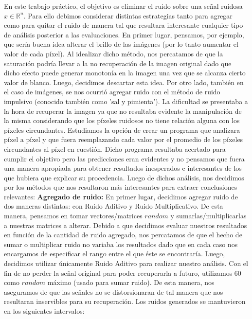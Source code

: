 \documentclass[10pt, a4paper]{article}
\newcommand{\real}{\mathbb{R}}
\begin{document}
\begin{itemize}
En este trabajo práctico, el objetivo es eliminar el ruido sobre una señal ruidosa $x\in\real^{n}$. Para ello debimos considerar distintas estrategias tanto para agregar como para quitar el ruido de manera tal que resultara interesante cualquier tipo de análisis posterior a las evaluaciones. En primer lugar, pensamos, por ejemplo, que sería buena idea alterar el brillo de las imágenes (por lo tanto aumentar el valor de cada píxel). Al idealizar dicho método, nos percatamos de que la saturación podría llevar a la no recuperación de la imagen original dado que dicho efecto puede generar monotonía en la imagen una vez que se alcanza cierto valor de blanco. Luego, decidimos descartar esta idea.
\newline
Por otro lado, también en el caso de imágenes, se nos ocurrió agregar ruido con el método de ruido impulsivo (conocido también como 'sal y pimienta'). La dificultad se presentaba a la hora de recuperar la imagen ya que no resultaba evidente la manipulación de la misma considerando que los píxeles ruidosos no tiene relación alguna con los píxeles circundantes. Estudiamos la opción de crear un programa que analizara píxel a píxel y que fuera reemplazando cada valor por el promedio de los píxeles circundantes al píxel en cuestión. Dicho programa resultaba acertado para cumplir el objetivo pero las predicciones eran evidentes y no pensamos que fuera una manera apropiada para obtener resultados inesperados e interesantes de los que hubiera que explicar su procedencia.\newline
\newline
Luego de dichos análisis, nos decidimos por los métodos que nos resultaron más interesantes para extraer conclusiones relevantes: \newline
\newline
\large{\textbf{Agregado de ruido:}}\newline
En primer lugar, decidimos agregar ruido de dos maneras distintas: con Ruido Aditivo y Ruido Multiplicativo. De esta manera, pensamos en tomar vectores/matrices $random$ y sumarlas/multiplicarlas a nuestras matrices a alterar. Debido a que decidimos evaluar nuestros resultados en función de la cantidad de ruido agregado, nos percatamos de que el hecho de sumar o multiplicar ruido no variaba los resultados dado que en cada caso nos encargamos de especificar el rango entre el que éste se encontraría. Luego, decidimos utilizar únicamente Ruido Aditivo para realizar nuestro análisis.\newline
 Con el fin de no perder la señal original para poder recuperarla a futuro, utilizamos 60 como $random$ máximo (usado para sumar ruido). De esta manera, nos aseguramos de que las señales no se distorsionaran de tal manera que nos resultaran inservibles para su recuperación. Los ruidos generados se mantuvieron en los siguientes intervalos: \newline

\end{itemize}
\end{document}
